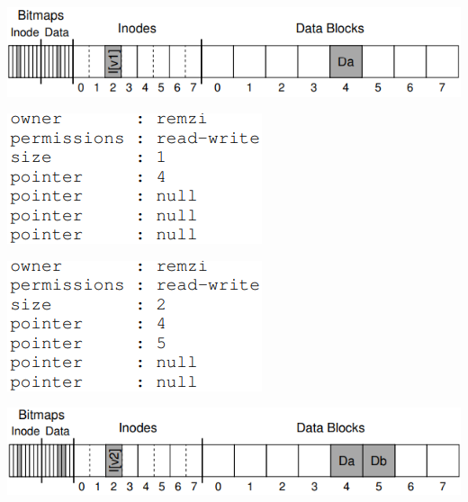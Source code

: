 \includegraphics[width=\linewidth]{imgs/jn_eg1}
\begin{minipage}{.5\linewidth}
  \includegraphics[width=\linewidth]{imgs/jn_eg3}
\end{minipage}
\begin{minipage}{.5\linewidth}
  \includegraphics[width=\linewidth]{imgs/jn_eg4}
\end{minipage}
\includegraphics[width=\linewidth]{imgs/jn_eg2}
